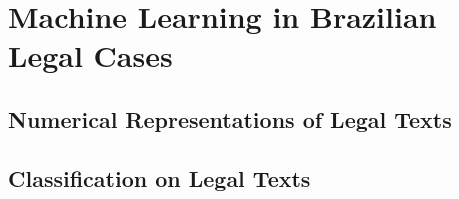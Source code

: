 \chapter{Machine Learning in Brazilian Legal Cases}

\section{Numerical Representations of Legal Texts}






\section{Classification on Legal Texts}




